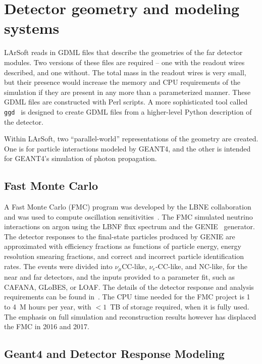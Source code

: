 \section{Detector geometry and modeling systems}

LArSoft reads in GDML files that describe the geometries of the far detector modules.  Two versions of these
files are required -- one with the readout wires described, and one without.  The total mass in the readout
wires is very small, but their presence would increase the memory and CPU requirements of the simulation
if they are present in any more than a parameterized manner.  These GDML files are constructed with Perl scripts.
A more sophisticated tool called {\tt{ggd}}~\cite{ggd} is designed to create GDML files from a higher-level
Python description of the detector.

Within LArSoft, two ``parallel-world'' representations of the geometry are created.  One is for particle interactions
modeled by GEANT4, and the other is intended for GEANT4's simulation of photon propagation.

\subsection{Fast Monte Carlo}

A Fast Monte Carlo (FMC) program was developed by the LBNE collaboration and was used to
compute oscillation sensitivities~\cite{cdr-vol-2}.  The FMC simulated neutrino interactions
on argon using the LBNF flux spectrum and the GENIE~\cite{GENIE} generator.  The detector
responses to the final-state particles produced by GENIE are approximated with efficiency
fractions as functions of particle energy, energy resolution smearing fractions, and
correct and incorrect particle identification rates.  The events were divided into
$\nu_\mu$CC-like, $\nu_e$-CC-like, and NC-like, for the near and far detectors, and the
inputs provided to a parameter fit, such as CAFANA, GLoBES, or LOAF.  The details of the
detector response and analysis requirements can be found in~\cite{cdr-vol-2}.  The CPU time needed
for the FMC project is 1 to 4~M hours per year, with $<1$~TB of storage required, when
it is fully used.  The emphasis on full simulation and reconstruction results however has
displaced the FMC in 2016 and 2017. 

\subsection{Geant4 and Detector Response Modeling}

